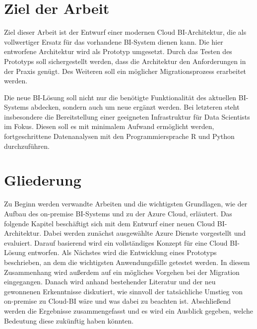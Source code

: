 \section{Ziel der Arbeit} \label{sec:intro:ziele}
Ziel dieser Arbeit ist der Entwurf einer modernen Cloud BI-Architektur, die als vollwertiger Ersatz für das vorhandene BI-System dienen kann. Die hier entworfene Architektur wird als Prototyp umgesetzt. Durch das Testen des Prototyps soll sichergestellt werden, dass die Architektur den Anforderungen in der Praxis genügt. Des Weiteren soll ein möglicher Migrationsprozess erarbeitet werden.

Die neue BI-Lösung soll nicht nur die benötigte Funktionalität des aktuellen BI-Systems abdecken, sondern auch um neue ergänzt werden. Bei letzteren steht insbesondere die Bereitstellung einer geeigneten Infrastruktur für Data Scientists im Fokus. Diesen soll es mit minimalem Aufwand ermöglicht werden, fortgeschrittene Datenanalysen mit den Programmiersprache R und Python durchzuführen.

\section{Gliederung} \label{sec:intro:struktur}
Zu Beginn werden verwandte Arbeiten und die wichtigsten Grundlagen, wie der Aufbau des on-premise BI-Systems und zu der Azure Cloud, erläutert. Das folgende Kapitel beschäftigt sich mit dem Entwurf einer neuen Cloud BI-Architektur. Dabei werden zunächst ausgewählte Azure Dienste vorgestellt und evaluiert. Darauf basierend wird ein vollständiges Konzept für eine Cloud BI-Lösung entworfen. Als Nächstes wird die Entwicklung eines Prototyps beschrieben, an dem die wichtigsten Anwendungsfälle getestet werden. In diesem Zusammenhang wird außerdem auf ein mögliches Vorgehen bei der Migration eingegangen. Danach wird anhand bestehender Literatur und der neu gewonnenen Erkenntnisse diskutiert, wie sinnvoll der tatsächliche Umstieg von on-premise zu Cloud-BI wäre und was dabei zu beachten ist. Abschließend werden die Ergebnisse zusammengefasst und es wird ein Ausblick gegeben, welche Bedeutung diese zukünftig haben könnten.